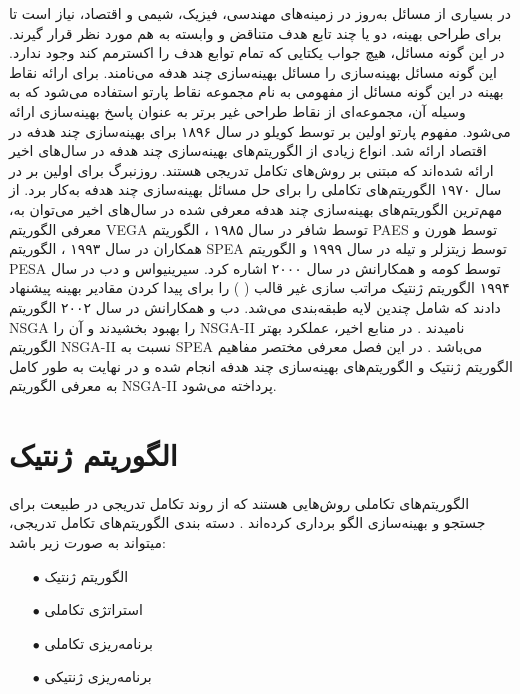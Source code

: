 \documentclass[a4paper,titlepage,12pt,fleqn,oneside]{report}
\begin{document}
	در بسیاری از مسائل به‌روز در زمینه‌های مهندسی، فیزیک، شیمی و اقتصاد، نیاز است تا برای طراحی بهینه، دو یا چند تابع هدف متناقض و وابسته به هم مورد نظر قرار گیرند. در این گونه مسائل، هیچ جواب یکتایی که تمام توابع هدف را اکسترمم کند وجود ندارد. این گونه مسائل بهینه‌سازی را مسائل بهینه‌سازی چند هدفه می‌نامند. برای ارائه نقاط بهینه در این گونه مسائل از مفهومی به نام مجموعه نقاط پارتو استفاده می‌شود که به وسیله آن، مجموعه‌ای از نقاط طراحی غیر برتر به عنوان پاسخ بهینه‌سازی ارائه می‌شود. مفهوم پارتو اولین بر توسط کویلو \cite{Coello2007} در سال ۱۸۹۶ برای بهینه‌سازی چند هدفه در اقتصاد ارائه شد. انواع زیادی از الگوریتم‌های بهینه‌سازی چند هدفه در سال‌های اخیر ارائه شده‌ا‌ند که مبتنی بر روش‌های تکامل تدریجی هستند. روزنبرگ برای اولین بر در سال ۱۹۷۰ \cite{Rosenberg1970} الگوریتم‌های تکاملی را برای حل مسائل بهینه‌سازی چند هدفه به‌کار برد. از مهم‌ترین الگوریتم‌های بهینه‌سازی چند هدفه معرفی شده در سال‌های اخیر می‌توان به، معرفی الگوریتم VEGA%
	توسط شافر در سال ۱۹۸۵ \cite{Schaffer1985}، الگوریتم PAES%
	توسط هورن و همکاران در سال ۱۹۹۳ \cite{Horn1993}، الگوریتم SPEA%
	توسط زیتزلر و تیله در سال ۱۹۹۹ \cite{Zitzler1999}و الگوریتم PESA%
	توسط کومه و همکارانش در سال ۲۰۰۰ \cite{Corne2000} اشاره کرد. سیرینیواس و دب در سال ۱۹۹۴ \cite{Srinivas1994} الگوریتم ژنتیک مراتب سازی غیر قالب (%
	)
	را برای پیدا کردن مقادیر بهینه پیشنهاد دادند که شامل چندین لایه طبقه‌بندی می‌شد. دب و همکارانش در سال ۲۰۰۲ الگوریتم NSGA را بهبود بخشیدند و آن را NSGA-II نامیدند \cite{K.DebA.PratapS.Agarwal2002}. در منابع اخیر، عملکرد بهتر الگوریتم NSGA-II نسبت به SPEA می‌باشد \cite{Toffolo2003}. در این فصل معرفی مختصر مفاهیم الگوریتم ژنتیک و الگوریتم‌های بهینه‌سازی چند هدفه انجام شده و در نهایت به طور کامل به معرفی الگوریتم NSGA-II پرداخته می‌شود.
	\section{الگوریتم ژنتیک}
	\paragraph{}
	الگوریتم‌های تکاملی روش‌هایی هستند که از روند تکامل تدریجی در طبیعت برای جستجو و بهینه‌سازی الگو برداری کرده‌ا‌ند \cite{Holland1975}. دسته بندی الگوریتم‌های تکامل تدریجی، میتواند به صورت زیر باشد:
	\begin{itemize}
		\item[$\bullet$]
		الگوریتم ژنتیک
		\item[$\bullet$] 
		استراتژی تکاملی
		\item[$\bullet$] 
		برنامه‌ریزی تکاملی
		\item[$\bullet$] 
		برنامه‌ریزی ژنتیکی
	\end{itemize}
	
\end{document}
